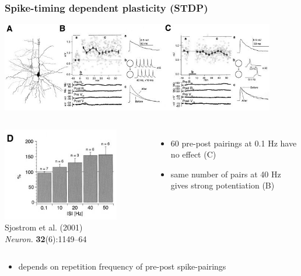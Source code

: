 \documentclass{beamer}
\begin{document}
\begin{frame}
  \frametitle{Spike-timing dependent plasticity (STDP)}

\includegraphics[width=0.9\textwidth]{./figures/stdp_exp1}
\begin{columns}
\hspace*{1.5mm}
\includegraphics[width=0.8\textwidth]{./figures/stdp_exp2}
\vspace*{1mm}
\hspace*{3mm}\tiny{Sjostrom et al. (2001)\\
\hspace*{3mm}\textit{Neuron.} \textbf{32}(6):1149--64}
\begin{itemize}
  \item 60 pre-post pairings at 0.1 Hz have no effect (C)
  \item same number of pairs at 40 Hz gives strong potentiation (B)
\end{itemize}

\end{columns}

\begin{itemize}
  \item depends on repetition frequency of pre-post spike-pairings
\end{itemize}

\end{frame}
\end{document}
